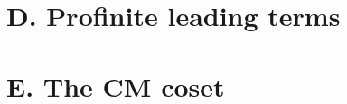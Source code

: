 \documentclass[11pt,a4paper]{article}
\begin{document}
\section{D. Profinite leading terms}

\section{E. The CM coset}



\end{document}
